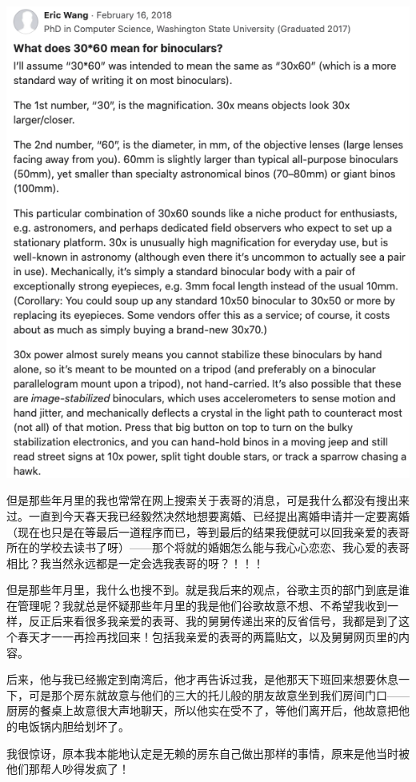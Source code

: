 \documentclass[9pt, b5paper]{article}
\begin{document}
\begin{center}
\includegraphics[width=.9\linewidth]{./pic/readme_20210429_202505.png}
\end{center}

但是那些年月里的我也常常在网上搜索关于表哥的消息，可是我什么都没有搜出来过。一直到今天春天我已经毅然决然地想要离婚、已经提出离婚申请并一定要离婚（现在也只是在等最后一道程序而已，等到最后的结果我便就可以回我亲爱的表哥所在的学校去读书了呀）——那个将就的婚姻怎么能与我心心恋恋、我心爱的表哥相比？我当然永远都是一定会选我表哥的呀？！！！

但是那些年月里，我什么也搜不到。就是我后来的观点，谷歌主页的部门到底是谁在管理呢？我就总是怀疑那些年月里的我是他们谷歌故意不想、不希望我收到一样，反正后来看很多我亲爱的表哥、我的舅舅传递出来的反省信号，我都是到了这个春天才一一再捡再找回来！包括我亲爱的表哥的两篇贴文，以及舅舅网页里的内容。 

后来，他与我已经搬定到南湾后，他才再告诉过我，是他那天下班回来想要休息一下，可是那个房东就故意与他们的三大的托儿般的朋友故意坐到我们房间门口——厨房的餐桌上故意很大声地聊天，所以他实在受不了，等他们离开后，他故意把他的电饭锅内胆给划坏了。 

我很惊讶，原本我本能地认定是无赖的房东自己做出那样的事情，原来是他当时被他们那帮人吵得发疯了！
\end{document}

